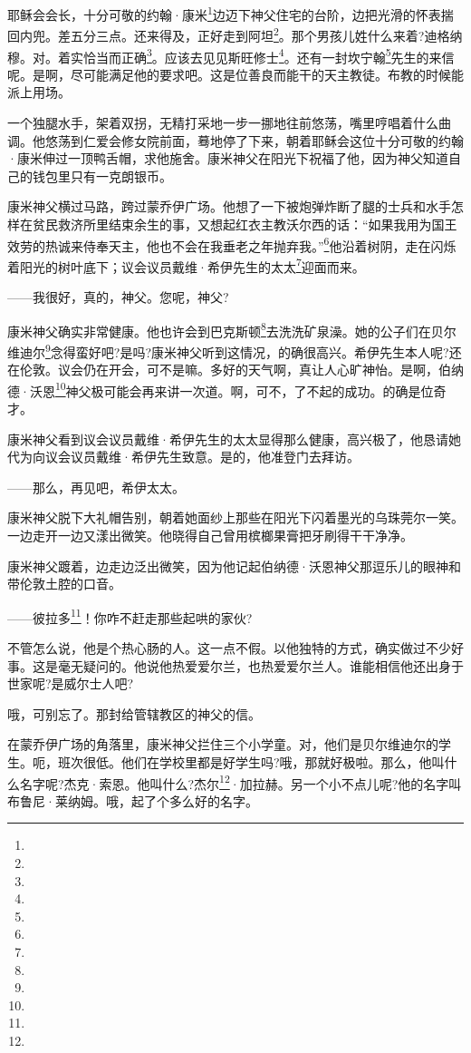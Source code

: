 \par 耶稣会会长，十分可敬的约翰·康米\footnote{}边迈下神父住宅的台阶，边把光滑的怀表揣回内兜。差五分三点。还来得及，正好走到阿坦\footnote{}。那个男孩儿姓什么来着?迪格纳穆。对。着实恰当而正确\footnote{}。应该去见见斯旺修士\footnote{}。还有一封坎宁翰\footnote{}先生的来信呢。是啊，尽可能满足他的要求吧。这是位善良而能干的天主教徒。布教的时候能派上用场。
\par 一个独腿水手，架着双拐，无精打采地一步一挪地往前悠荡，嘴里哼唱着什么曲调。他悠荡到仁爱会修女院前面，蓦地停了下来，朝着耶稣会这位十分可敬的约翰·康米伸过一顶鸭舌帽，求他施舍。康米神父在阳光下祝福了他，因为神父知道自己的钱包里只有一克朗银币。
\par 康米神父横过马路，跨过蒙乔伊广场。他想了一下被炮弹炸断了腿的士兵和水手怎样在贫民救济所里结束余生的事，又想起红衣主教沃尔西的话：“如果我用为国王效劳的热诚来侍奉天主，他也不会在我垂老之年抛弃我。”\footnote{}他沿着树阴，走在闪烁着阳光的树叶底下；议会议员戴维·希伊先生的太太\footnote{}迎面而来。
\par ——我很好，真的，神父。您呢，神父?
\par 康米神父确实非常健康。他也许会到巴克斯顿\footnote{}去洗洗矿泉澡。她的公子们在贝尔维迪尔\footnote{}念得蛮好吧?是吗?康米神父听到这情况，的确很高兴。希伊先生本人呢?还在伦敦。议会仍在开会，可不是嘛。多好的天气啊，真让人心旷神怡。是啊，伯纳德·沃恩\footnote{}神父极可能会再来讲一次道。啊，可不，了不起的成功。的确是位奇才。
\par 康米神父看到议会议员戴维·希伊先生的太太显得那么健康，高兴极了，他恳请她代为向议会议员戴维·希伊先生致意。是的，他准登门去拜访。
\par ——那么，再见吧，希伊太太。
\par 康米神父脱下大礼帽告别，朝着她面纱上那些在阳光下闪着墨光的乌珠莞尔一笑。一边走开一边又漾出微笑。他晓得自己曾用槟榔果膏把牙刷得干干净净。
\par 康米神父踱着，边走边泛出微笑，因为他记起伯纳德·沃恩神父那逗乐儿的眼神和带伦敦土腔的口音。
\par ——彼拉多\footnote{}！你咋不赶走那些起哄的家伙?
\par 不管怎么说，他是个热心肠的人。这一点不假。以他独特的方式，确实做过不少好事。这是毫无疑问的。他说他热爱爱尔兰，也热爱爱尔兰人。谁能相信他还出身于世家呢?是威尔士人吧?
\par 哦，可别忘了。那封给管辖教区的神父的信。
\par 在蒙乔伊广场的角落里，康米神父拦住三个小学童。对，他们是贝尔维迪尔的学生。呃，班次很低。他们在学校里都是好学生吗?哦，那就好极啦。那么，他叫什么名字呢?杰克·索恩。他叫什么?杰尔\footnote{}·加拉赫。另一个小不点儿呢?他的名字叫布鲁尼·莱纳姆。哦，起了个多么好的名字。
